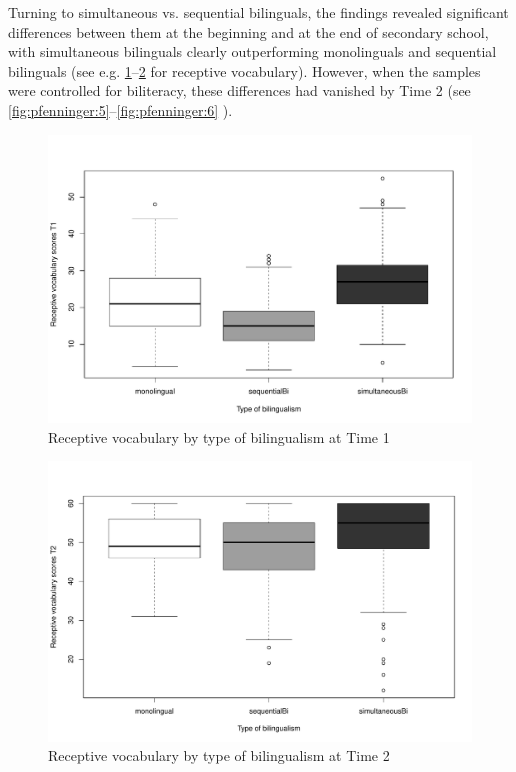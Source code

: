 \documentclass[output=paper,modfonts,nonflat,newtxmath]{langsci/langscibook}
\begin{document}
Turning to simultaneous vs. sequential bilinguals, the findings revealed significant differences between them at the beginning and at the end of secondary school, with simultaneous bilinguals clearly outperforming monolinguals and sequential bilinguals (see e.g. \ref{fig:pfenninger:3}--\ref{fig:pfenninger:4} for receptive vocabulary). However, when the samples were controlled for biliteracy, these differences had vanished by Time 2 (see \ref{fig:pfenninger:5}--\ref{fig:pfenninger:6} ).%

\begin{figure} %
\includegraphics[height=.45\textheight]{figures/PfenningerFigure3.pdf}
\caption{\label{fig:pfenninger:3} Receptive vocabulary by type of bilingualism at Time 1}
\end{figure}

\begin{figure} %
\includegraphics[height=.45\textheight]{figures/PfenningerFigure4.pdf}
\caption{\label{fig:pfenninger:4} Receptive vocabulary by type of bilingualism at Time 2}
 \end{figure}
\end{document}
